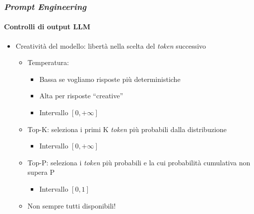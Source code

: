 \begin{frame}[t] \frametitle{\emph{Prompt Engineering}}
\framesubtitle{Controlli di output LLM}
{\footnotesize
    \begin{minipage}[t]{\textwidth}
        \begin{itemize}[leftmargin=10pt,align=right]
            \item[\alertedcircled{2}] \alert{Creatività del modello:} libertà nella scelta del \emph{token} successivo
            \begin{itemize}[leftmargin=10pt,align=right]
                \item[\alert{\faArrowCircleRight}] \alert{Temperatura:}
                \begin{itemize}[leftmargin=10pt,align=right]
                    \item[\alert{\faArrowCircleRight}] \alert{Bassa} se vogliamo risposte più deterministiche
                    \item[\alert{\faArrowCircleRight}] \alert{Alta} per risposte ``creative''
                    \item[\alert{\faExclamationTriangle}] Intervallo $[0, +\infty]$
                \end{itemize}
                \item[\alert{\faArrowCircleRight}] \alert{Top-K:} seleziona i primi K \textit{token} più probabili dalla distribuzione
                 \begin{itemize}[leftmargin=10pt,align=right]
                    \item[\alert{\faExclamationTriangle}] Intervallo $[0, +\infty]$
                \end{itemize}               
                \item[\alert{\faArrowCircleRight}] \alert{Top-P:} seleziona i \textit{token} più probabili e la cui probabilità cumulativa non supera P
                  \begin{itemize}[leftmargin=10pt,align=right]
                    \item[\alert{\faExclamationTriangle}] Intervallo $[0, 1]$
                \end{itemize}                    
                \item[\alert{\faExclamationTriangle}] Non sempre tutti disponibili!
            \end{itemize}
        \end{itemize}
    \end{minipage}
}
\end{frame}
